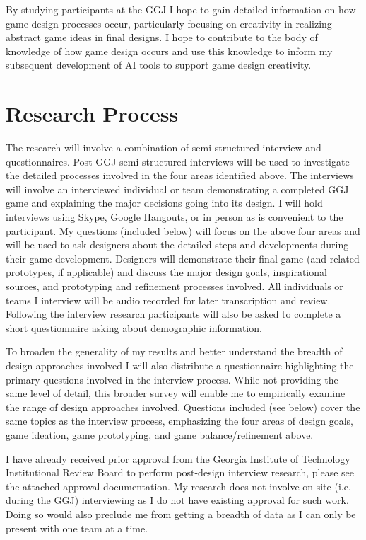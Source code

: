 \documentclass[]{article}
\begin{document}
By studying participants at the GGJ I hope to gain detailed information on how game design processes occur, particularly focusing on creativity in realizing abstract game ideas in final designs. I hope to contribute to the body of knowledge of how game design occurs and use this knowledge to inform my subsequent development of AI tools to support game design creativity. 


\section{Research Process}
The research will involve a combination of semi-structured interview and questionnaires. Post-GGJ semi-structured interviews will be used to investigate the detailed processes involved in the four areas identified above. The interviews will involve an interviewed individual or team demonstrating a completed GGJ game and explaining the major decisions going into its design. I will hold interviews using Skype, Google Hangouts, or in person as is convenient to the participant. My questions (included below) will focus on the above four areas and will be used to ask designers about the detailed steps and developments during their game development. Designers will demonstrate their final game (and related prototypes, if applicable) and discuss the major design goals, inspirational sources, and prototyping and refinement processes involved. All individuals or teams I interview will be audio recorded for later transcription and review. Following the interview research participants will also be asked to complete a short questionnaire asking about demographic information.

To broaden the generality of my results and better understand the breadth of design approaches involved I will also distribute a questionnaire highlighting the primary questions involved in the interview process. While not providing the same level of detail, this broader survey will enable me to empirically examine the range of design approaches involved. Questions included (see below) cover the same topics as the interview process, emphasizing the four areas of design goals, game ideation, game prototyping, and game balance/refinement above.

I have already received prior approval from the Georgia Institute of Technology Institutional Review Board to perform post-design interview research, please see the attached approval documentation. My research does not involve on-site (i.e. during the GGJ) interviewing as I do not have existing approval for such work. Doing so would also preclude me from getting a breadth of data as I can only be present with one team at a time. 
\end{document}
